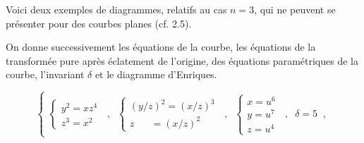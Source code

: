 Voici deux exemples de diagrammes, relatifs au cas $n = 3$, qui ne peuvent se présenter pour des courbes planes (cf. 2.5).

On donne successivement les équations de la courbe, les équations
de la transformée pure après éclatement de l'origine, des équations paramétriques de la courbe, l'invariant $\delta$ et le diagramme d'Enriques.

\begin{equation}\tag{2.25.1}
\left\{
\begin{array}{l}
\left\{\begin{array}{l} y^{2} = xz^{4} \\ z^{3} = x^{2} \end{array}\right. \;\;,\;\;
\left\{\begin{array}{l} (y/z)^{2} = (x/z)^{3} \\ z \;\;\;\;\;\; = (x/z)^{2} \end{array}\right. \;\;,\;\;
\left\{\begin{array}{l} x = u^{6} \\ y = u^{7} \\ z = u^{4} \end{array}\right. \;\;,\;\; \delta = 5 \;\;,
\end{array}
\right.
\end{equation}
\begin{center}
\end{center}
